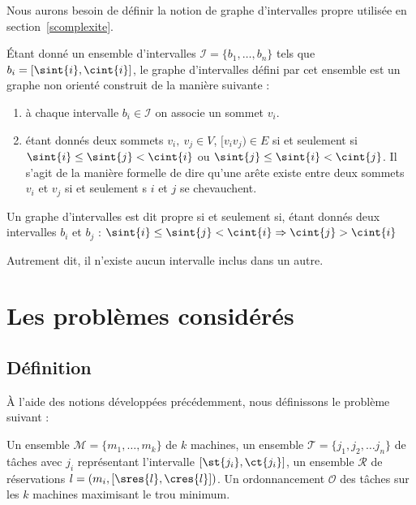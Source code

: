 \documentclass[a4paper,9pt]{report}
\begin{document}
Nous aurons besoin de définir la notion de graphe d'intervalles propre utilisée en
section~\ref{scomplexite}.

\begin{ndf}
    Étant donné un ensemble d'intervalles $\mathcal{I} = \{b_1, \dots, b_n\}$ tels que $b_i = [\sint{i},
    \cint{i}]$, le graphe d'intervalles défini par cet ensemble est un graphe non orienté construit de la
    manière suivante :
    \begin{enumerate}
        \item à chaque intervalle $b_i \in \mathcal{I}$ on associe un sommet $v_i$.
        \item étant donnés deux sommets $v_i,\ v_j \in V$, $[v_iv_j) \in E$ si et seulement si 
            $\sint{i} \leq \sint{j} < \cint{i}$ ou $\sint{j} \leq \sint{i} < \cint{j}$. Il s'agit
            de la manière formelle de dire qu'une arête existe entre deux sommets $v_i$ et $v_j$ si
            et seulement s $i$ et $j$ se chevauchent.
    \end{enumerate}

    Un graphe d'intervalles est dit propre si et seulement si, étant donnés deux intervalles $b_i$
    et $b_j$ : $\sint{i} \leq \sint{j} < \cint{i} \Rightarrow \cint{j} > \cint{i}$

    Autrement dit, il n'existe aucun intervalle inclus dans un autre.
\end{ndf}

\section{Les problèmes considérés}

\subsection{Définition}
\label{def_pb}

À l'aide des notions développées précédemment, nous définissons le problème suivant :

\dfopt{\fisched}
{Un ensemble $\mathcal{M} = \{m_1, \dots, m_k\}$ de $k$ machines, un ensemble $\mathcal{T} = \{j_1,
    j_2, \dots j_n\}$ de tâches avec $j_i$ représentant l'intervalle $[\st{j_i}, \ct{j_i}]$, un
ensemble $\mathcal{R}$ de réservations $l = (m_i, [\sres{l}, \cres{l}])$.} 
{Un ordonnancement $\mathcal{O}$ des tâches sur les $k$ machines maximisant le trou
minimum.}
\end{document}
